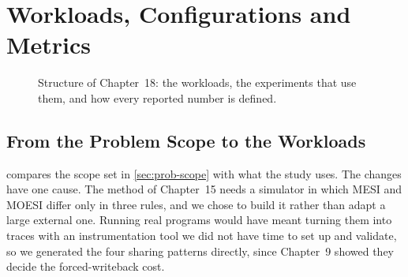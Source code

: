 \chapter{Workloads, Configurations and Metrics}
\label{ch:workloads}

\begin{figure}[htbp]
\centering
{}
\caption[]{Structure of Chapter~18: the workloads, the
experiments that use them, and how every reported number is defined.}
\label{fig:ch18-map}
\end{figure}

\section{From the Problem Scope to the Workloads}
\label{sec:wl-scope}
%

 compares the scope set in \cref{sec:prob-scope} with what
the study uses. The changes have one cause. The method of Chapter~15 needs a
simulator in which MESI and MOESI differ only in three rules, and we chose to build
it rather than adapt a large external one. Running real programs would have meant
turning them into traces with an instrumentation tool we did not have time to set
up and validate, so we generated the four sharing patterns directly, since
Chapter~9 showed they decide the forced-writeback cost.

